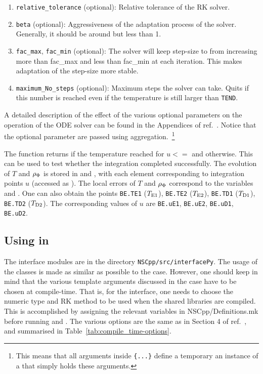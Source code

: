 \documentclass[11pt,a4paper]{article}
\begin{document}
\begin{enumerate}
	\item {\tt relative\_tolerance} (optional): Relative tolerance of the RK solver.
	
	\item {\tt beta} (optional): Aggressiveness of the adaptation process of the solver. Generally, it should be around but less than 1.
	
	\item {\tt fac\_max},  {\tt fac\_min} (optional): The solver will keep step-size to from increasing more than fac\_max and less than fac\_min at each iteration. This makes adaptation of the step-size more stable.
	
	\item {\tt maximum\_No\_steps} (optional): Maximum steps the solver can take. Quits if this number is reached even if the temperature is still larger than {\tt TEND}. 
\end{enumerate}
%
A detailed description of the  effect of the various optional parameters on the operation of the ODE solver can be found in the Appendices of ref.~\cite{Karamitros:2021nxi}. Notice that the optional parameter are passed using aggregation.~\footnote{This means that all arguments inside {\tt \{...\}} define a temporary an instance of a  that simply holds these arguments.} 


The  function returns  if the temperature reached  for $u<=$ and  otherwise. This can be used to test whether the integration completed successfully.
%
The evolution of $T$ and $\rho_{\Phi}$ is stored in  and , with each element corresponding to integration points $u$ (accessed as ). The local errors of $T$ and $\rho_{\Phi}$ correspond to the variables  and . 
%
One can also obtain the points {\tt BE.TE1} ($T_{\rm E1}{}$), {\tt BE.TE2} ($T_{\rm E2}{}$), {\tt BE.TD1} ($T_{\rm D1}{}$), {\tt BE.TD2} ($T_{\rm D2}{}$). The corresponding values of $u$ are {\tt BE.uE1}, {\tt BE.uE2}, {\tt BE.uD1}, {\tt BE.uD2}.

\subsection{Using \nsc in \PY}\label{sec:py_usage}
%
The \PY interface modules are in the directory {\tt NSCpp/src/interfacePy}. The usage of the classes is made as similar as possible to the \CPP case. However, one should keep in mind that the various template arguments discussed in the \CPP case have to be chosen at compile-time. That is, for the \PY interface, one needs to choose the numeric type and RK method to be used when the shared libraries are compiled. This is accomplished by assigning the relevant variables in {NSCpp/Definitions.mk} before running  and . The various options are the same as in Section 4 of ref.~\cite{Karamitros:2021nxi}, and summarised in Table~\ref{tab:compile_time-options}.
\end{document}
